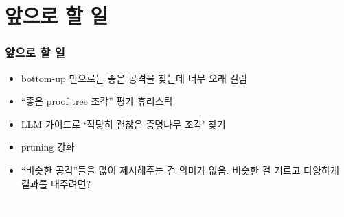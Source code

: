 \documentclass{simplesnt}
\begin{document}
\section{앞으로 할 일}
\begin{frame}
  \frametitle{앞으로 할 일}
  \begin{itemize}
    \item<1-> bottom-up 만으로는 좋은 공격을 찾는데 너무 오래 걸림
    \item<2-> ``좋은 proof tree 조각'' 평가 휴리스틱
    \item<3-> LLM 가이드로 `적당히 괜찮은 증명나무 조각' 찾기
    \item<4-> pruning 강화
    \item<5-> ``비슷한 공격''들을 많이 제시해주는 건 의미가 없음. 비슷한 걸 거르고 다양하게 결과를 내주려면?
  \end{itemize}
\end{frame}





\addtocounter{framenumber}{-1} %
\appendix
\begin{frame}[c] %
  \centering
  {\Large \textcolor{white}{감사합니다}}
\end{frame}
\end{document}
